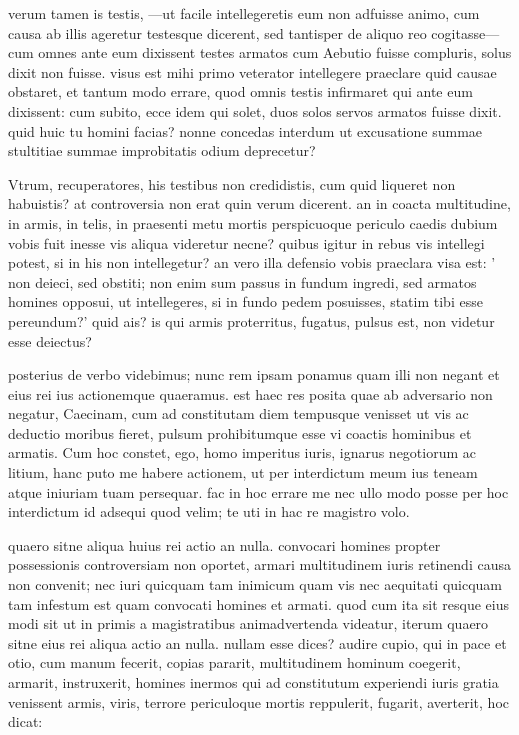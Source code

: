 verum tamen is testis, —ut facile intellegeretis eum non adfuisse animo, cum causa ab illis ageretur testesque dicerent, sed tantisper de aliquo reo cogitasse—cum omnes ante eum dixissent testes armatos cum Aebutio fuisse compluris, solus dixit non fuisse. visus est mihi primo veterator intellegere praeclare quid causae obstaret, et tantum modo errare, quod omnis testis infirmaret qui ante eum dixissent: cum subito, ecce idem qui solet, duos solos servos armatos fuisse dixit. quid huic tu homini facias? nonne concedas interdum ut excusatione summae stultitiae summae improbitatis odium deprecetur?

 Vtrum, recuperatores, his testibus non credidistis, cum quid liqueret non habuistis? at controversia non erat quin verum dicerent. an in coacta multitudine, in armis, in telis, in praesenti metu mortis perspicuoque periculo caedis dubium vobis fuit inesse vis aliqua videretur necne? quibus igitur in rebus vis intellegi potest, si in his non intellegetur? an vero illa defensio vobis praeclara visa est: ' non deieci, sed obstiti; non enim sum passus in fundum ingredi, sed armatos homines opposui, ut intellegeres, si in fundo pedem posuisses, statim tibi esse pereundum?' quid ais? is qui armis proterritus, fugatus, pulsus est, non videtur esse deiectus?

 posterius de verbo videbimus; nunc rem ipsam ponamus quam illi non negant et eius rei ius actionemque quaeramus. est haec res posita quae ab adversario non negatur, Caecinam, cum ad constitutam diem tempusque venisset ut vis ac deductio moribus fieret, pulsum prohibitumque esse vi coactis hominibus et armatis. Cum hoc constet, ego, homo imperitus iuris, ignarus negotiorum ac litium, hanc puto me habere actionem, ut per interdictum meum ius teneam atque iniuriam tuam persequar. fac in hoc errare me nec ullo modo posse per hoc interdictum id adsequi quod velim; te uti in hac re magistro volo.

 quaero sitne aliqua huius rei actio an nulla. convocari homines propter possessionis controversiam non oportet, armari multitudinem iuris retinendi causa non convenit; nec iuri quicquam tam inimicum quam vis nec aequitati quicquam tam infestum est quam convocati homines et armati. quod cum ita sit resque eius modi sit ut in primis a magistratibus animadvertenda videatur, iterum quaero sitne eius rei aliqua actio an nulla. nullam esse dices? audire cupio, qui in pace et otio, cum manum fecerit, copias pararit, multitudinem hominum coegerit, armarit, instruxerit, homines inermos qui ad constitutum experiendi iuris gratia venissent armis, viris, terrore periculoque mortis reppulerit, fugarit, averterit, hoc dicat:

